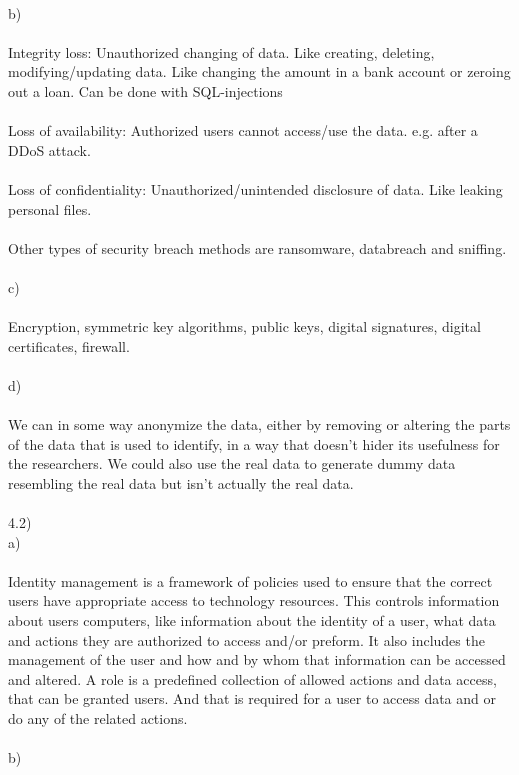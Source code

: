 \documentclass[12pt, letterpaper, twoside]{article}
\begin{document}
\newpage
\ \\
b)\\
\ \\
Integrity loss: Unauthorized changing of data. Like creating, deleting, modifying/updating data. Like changing the amount in a bank account or zeroing out a loan. Can be done with SQL-injections\\
\ \\
Loss of availability: Authorized users cannot access/use the data. e.g. after a DDoS attack.\\
\ \\
Loss of confidentiality: Unauthorized/unintended disclosure of data. Like leaking personal files.\\
\ \\
Other types of security breach methods are ransomware, databreach and sniffing.\\
\ \\
c)\\
\ \\
Encryption, symmetric key algorithms, public keys, digital signatures, digital certificates, firewall.\\
\ \\
d)\\
\ \\
We can in some way anonymize the data, either by removing or altering the parts of the data that is used to identify, in a way that doesn't hider its usefulness for the researchers. We could also use the real data to generate dummy data resembling the real data but isn't actually the real data.\\
\newpage
\ \\
4.2)\\
a)\\
\ \\
Identity management is a framework of policies used to ensure that the correct users have appropriate access to technology resources. This controls information about users computers, like information about the identity of a user, what data and actions they are authorized to access and/or preform. It also includes the management of the user and how and by whom that information can be accessed and altered. A role is a predefined collection of allowed actions and data access, that can be granted users. And that is required for a user to access data and or do any of the related actions.\\
\ \\
b)\\
\ \\
\end{document}
